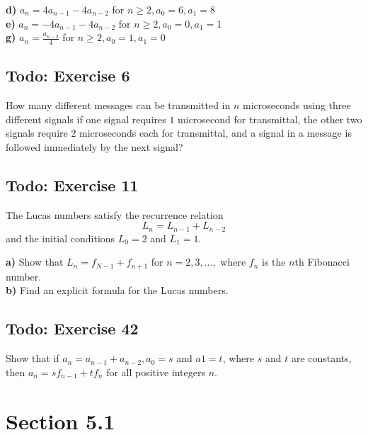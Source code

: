 \documentclass[12pt]{article}
\begin{document}
    \textbf{d)} $ a_n=4a_{n-1} - 4a_{n-2} $ for $ n \geq 2, a_0=6, a_1=8 $\\
    \textbf{e)} $ a_n=-4a_{n-1} - 4a_{n-2} $ for $ n \geq 2, a_0=0, a_1=1 $\\
    \textbf{g)} $ a_n=\frac{a_{n-2}}{4} $ for $ n \geq 2, a_0=1, a_1=0 $
    \subsection{Todo: Exercise 6}
    How many different messages can be transmitted in $n$ microseconds using three different signals if one signal requires $1$ microsecond for transmittal, the other two signals require $2$ microseconds each for transmittal, and a signal in a message is followed immediately by the next signal?

    \subsection{Todo: Exercise 11}
    The Lucas numbers satisfy the recurrence relation
    \begin{equation}
        L_n=L_{n-1}+L_{n-2}
    \end{equation}
    and the initial conditions $L_0 = 2$ and $L_1=1$.

    \textbf{a)} Show that $L_n = f_{N-1}+f_{n+1}$ for $n=2,3,...,$ where $f_n$ is the $n$th Fibonacci number.\\
    \textbf{b)} Find an explicit formula for the Lucas numbers.

    \subsection{Todo: Exercise 42}
    Show that if $a_n =a_{n-1} + a_{n-2}, a_0=s$ and $a1 =t$, where $s$ and $t$ are constants, then $a_n = sf_{n-1} + tf_n$ for all positive integers $n$.

    \section{Section 5.1} 
\end{document}
